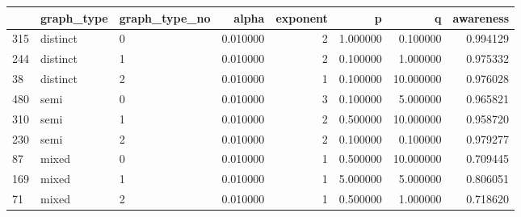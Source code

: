 \begin{tabular}{lllrrrrr}
\toprule
 & graph_type & graph_type_no & alpha & exponent & p & q & awareness \\
\midrule
315 & distinct & 0 & 0.010000 & 2 & 1.000000 & 0.100000 & 0.994129 \\
244 & distinct & 1 & 0.010000 & 2 & 0.100000 & 1.000000 & 0.975332 \\
38 & distinct & 2 & 0.010000 & 1 & 0.100000 & 10.000000 & 0.976028 \\
480 & semi & 0 & 0.010000 & 3 & 0.100000 & 5.000000 & 0.965821 \\
310 & semi & 1 & 0.010000 & 2 & 0.500000 & 10.000000 & 0.958720 \\
230 & semi & 2 & 0.010000 & 2 & 0.100000 & 0.100000 & 0.979277 \\
87 & mixed & 0 & 0.010000 & 1 & 0.500000 & 10.000000 & 0.709445 \\
169 & mixed & 1 & 0.010000 & 1 & 5.000000 & 5.000000 & 0.806051 \\
71 & mixed & 2 & 0.010000 & 1 & 0.500000 & 1.000000 & 0.718620 \\
\bottomrule
\end{tabular}
